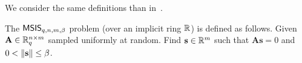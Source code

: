 




We consider the same definitions than in~\cite{ISC:BosCamNev18}.
\begin{definition}
	The $\mathsf{MSIS}_{q,n,m,\beta}$ problem (over an implicit ring $\mathbb{R}$) is defined as
	follows. Given $\mathbf{A} \in \mathbb{R}_q^{n\times m}$ sampled uniformly at random. Find
	$\mathbf{s}\in\mathbb{R}^m$ such that $\mathbf{A}\mathbf{s} = 0$ and $0 < \left\lVert \mathbf{s} \right\rVert \leq
	\beta$.
\end{definition}

